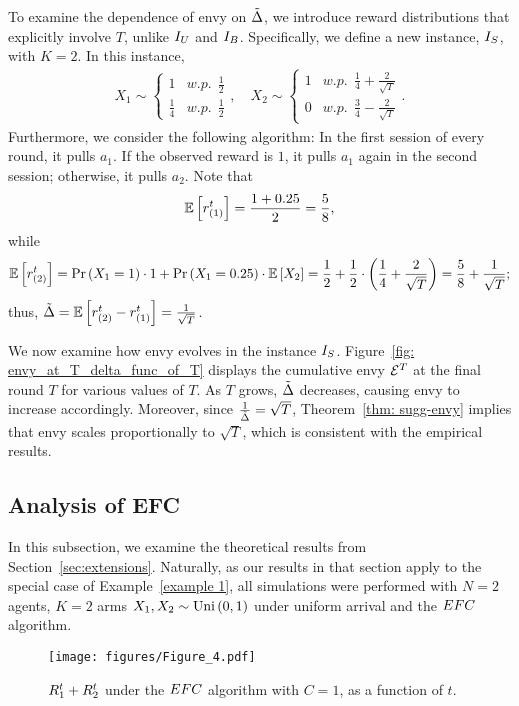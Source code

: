 To examine the dependence of envy on $\tilde\Delta$, we introduce reward distributions that explicitly involve $T$, unlike $I_U$ and $I_B$. 
Specifically, we define a new instance, $I_S$, with $K = 2$. 
In this instance,
\begin{align*}
    X_1 \sim
    \begin{cases}
    1 & w.p. \ \  \frac{1}{2} \\
    \frac{1}{4} & w.p.\  \ \frac{1}{2}
    \end{cases},\quad 
    X_2 \sim
    \begin{cases}
    1 & w.p. \ \  \frac{1}{4} + \frac{2}{\sqrt{T}} \\
    0 & w.p.\  \ \frac{3}{4} - \frac{2}{\sqrt{T}}
    \end{cases}.
\end{align*}
Furthermore, we consider the following algorithm: In the first session of every round, it pulls $a_1$. If the observed reward is $1$, it pulls $a_1$ again in the second session; otherwise, it pulls $a_2$. Note that 
\[
\mathbb{E}\left[ r_{(1)}^t \right]=\frac{1+0.25}{2}=\frac{5}{8},
\]
while
\[
\mathbb{E}\left[ r_{(2)}^t \right]= \Pr\left( X_1 = 1 \right)\cdot 1 + \Pr\left( X_1 = 0.25 \right)\cdot \mathbb{E}\left[ X_2 \right] = \frac{1}{2} + \frac{1}{2} \cdot \left( \frac{1}{4} + \frac{2}{\sqrt{T}} \right) = \frac{5}{8} +\frac{1}{\sqrt{T}};
\]
thus, $\tilde{\Delta}= \mathbb{E}\left[ r_{(2)}^t-r_{(1)}^t \right]= \frac{1}{\sqrt{T}}$.

We now examine how envy evolves in the instance $I_S$. 
Figure~\ref{fig: envy_at_T_delta_func_of_T} displays the cumulative envy $\mathcal{E}^T$ at the final round $T$ for various values of $T$. 
As $T$ grows, $\tilde{\Delta}$ decreases, causing envy to increase accordingly. 
Moreover, since $\tfrac{1}{\tilde{\Delta}} = \sqrt{T}$, Theorem~\ref{thm: sugg-envy} implies that envy scales proportionally to $\sqrt{T}$, which is consistent with the empirical results.

\subsection{Analysis of EFC}\label{subsec:sim efc}
In this subsection, we examine the theoretical results from Section~\ref{sec:extensions}. Naturally, as our results in that section apply to the special case of Example~\ref{example 1}, all simulations were performed with $N=2$ agents, $K=2$ arms $X_1, X_2 \sim \text{Uni}\left(0,1\right)$ under uniform arrival and the $EFC$ algorithm. %

\begin{figure}
    \centering
        \texttt{[image: figures/Figure\_4.pdf]}
        \caption{$R_{1}^t+R_{2}^t$ under the $EFC$ algorithm with $C=1$, as a function of $t$.%
        }\label{fig: sw ef1}
\end{figure}

